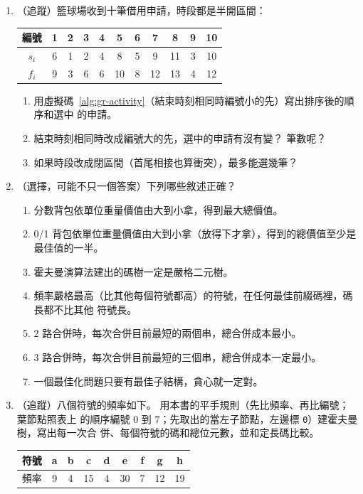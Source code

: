 \begin{enumerate}
\item \label{q:gr-act-trace}（追蹤）籃球場收到十筆借用申請，時段都是半開區間：
\begin{center}
\begin{tabular}{c*{10}{c}}
\toprule
編號 & 1 & 2 & 3 & 4 & 5 & 6 & 7 & 8 & 9 & 10 \\
\midrule
$s_i$ & 6 & 1 & 2 & 4 & 8 & 5 & 9 & 11 & 3 & 10 \\
$f_i$ & 9 & 3 & 6 & 6 & 10 & 8 & 12 & 13 & 4 & 12 \\
\bottomrule
\end{tabular}
\end{center}
\begin{enumerate}
\item 用虛擬碼~\ref{alg:gr-activity}（結束時刻相同時編號小的先）寫出排序後的順序和選中
的申請。
\item 結束時刻相同時改成編號大的先，選中的申請有沒有變？ 筆數呢？
\item 如果時段改成閉區間（首尾相接也算衝突），最多能選幾筆？
\end{enumerate}

\item （選擇，可能不只一個答案）下列哪些敘述正確？
\begin{enumerate}
\item 分數背包依單位重量價值由大到小拿，得到最大總價值。
\item 0/1 背包依單位重量價值由大到小拿（放得下才拿），得到的總價值至少是最佳值的一半。
\item 霍夫曼演算法建出的碼樹一定是嚴格二元樹。
\item 頻率嚴格最高（比其他每個符號都高）的符號，在任何最佳前綴碼裡，碼長都不比其他
符號長。
\item $2$ 路合併時，每次合併目前最短的兩個串，總合併成本最小。
\item $3$ 路合併時，每次合併目前最短的三個串，總合併成本一定最小。
\item 一個最佳化問題只要有最佳子結構，貪心就一定對。
\end{enumerate}

\item \label{q:gr-huff-trace}（追蹤）八個符號的頻率如下。 用本書的平手規則（先比頻率、再比編號；葉節點照表上
的順序編號 $0$ 到 $7$；先取出的當左子節點，左邊標 \texttt{0}）建霍夫曼樹，寫出每一次合
併、每個符號的碼和總位元數，並和定長碼比較。
\begin{center}
\begin{tabular}{c*{8}{c}}
\toprule
符號 & a & b & c & d & e & f & g & h \\
\midrule
頻率 & 9 & 4 & 15 & 4 & 30 & 7 & 12 & 19 \\
\bottomrule
\end{tabular}
\end{center}


\end{enumerate}
